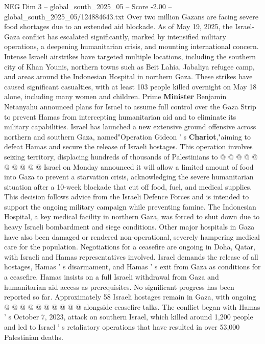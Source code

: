 \begin{textsample}{NEG Dim 3 – global\_south\_2025\_05 – Score -2.00 – global\_south\_2025\_05/124884643.txt}  \label{ex:f3_neg_177}
Over two million Gazans are facing severe food shortages due to an extended aid blockade.
As of May 19, 2025, the Israel-Gaza conflict has escalated significantly, marked by intensified military operations, a deepening humanitarian crisis, and mounting international concern.
Intense Israeli airstrikes have targeted multiple locations, including the southern city of Khan Younis, northern towns such as Beit Lahia, Jabaliya refugee camp, and areas around the Indonesian Hospital in northern Gaza.
These strikes have caused significant casualties, with at least 103 people killed overnight on May 18 alone, including many women and children.
Prime \textbf{Minister} Benjamin Netanyahu announced plans for Israel to assume full control over the Gaza Strip to prevent Hamas from intercepting humanitarian aid and to eliminate its military capabilities.
Israel has launched a new extensive ground offensive across northern and southern Gaza, named"Operation Gideon ' s \textbf{Chariot},"aiming to defeat Hamas and secure the release of Israeli hostages.
This operation involves seizing territory, displacing hundreds of thousands of Palestinians to @ @ @ @ @ @ @ @ @ @ Israel on Monday announced it will allow a limited amount of food into Gaza to prevent a starvation crisis, acknowledging the severe humanitarian situation after a 10-week blockade that cut off food, fuel, and medical supplies.
This decision follows advice from the Israeli Defence Forces and is intended to support the ongoing military campaign while preventing famine.
The Indonesian Hospital, a key medical facility in northern Gaza, was forced to shut down due to heavy Israeli bombardment and siege conditions.
Other major hospitals in Gaza have also been damaged or rendered non-operational, severely hampering medical care for the population.
Negotiations for a ceasefire are ongoing in Doha, Qatar, with Israeli and Hamas representatives involved.
Israel demands the release of all hostages, Hamas ' s disarmament, and Hamas ' s exit from Gaza as conditions for a ceasefire.
Hamas insists on a full Israeli withdrawal from Gaza and humanitarian aid access as prerequisites.
No significant progress has been reported so far.
Approximately 58 Israeli hostages remain in Gaza, with ongoing @ @ @ @ @ @ @ @ @ @ alongside ceasefire talks.
The conflict began with Hamas ' s October 7, 2023, attack on southern Israel, which killed around 1,200 people and led to Israel ' s retaliatory operations that have resulted in over 53,000 Palestinian deaths.

\end{textsample}

